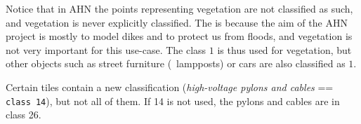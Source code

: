 Notice that in AHN the points representing vegetation are not classified as such, and vegetation is never explicitly classified.
The is because the aim of the AHN project is mostly to model dikes and to protect us from floods, and vegetation is not very important for this use-case.
The class $1$ is thus used for vegetation, but other objects such as street furniture (\eg\ lampposts) or cars are also classified as $1$.

%

Certain tiles contain a new classification (\emph{high-voltage pylons and cables} == \texttt{class 14}), but not all of them. 
If 14 is not used, the pylons and cables are in class 26.

%


